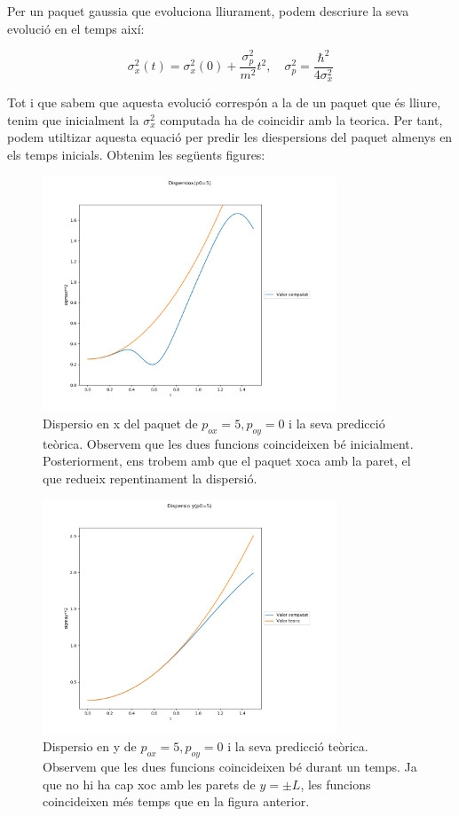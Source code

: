 \documentclass{article}
\begin{document}
Per un paquet gaussia que evoluciona lliurament, podem descriure la seva evolució en el temps així:

\begin{equation}
\sigma_x^2(t)=\sigma_x^2(0)+\frac{\sigma_p^2}{m^2}t^2, \quad \sigma_p^2=\frac{\hbar^2}{4\sigma_x^2}
\end{equation}

Tot i que sabem que aquesta evolució correspón a la de un paquet que és lliure, tenim que inicialment la \(\sigma_x^2\) computada ha de coincidir amb la teorica. Per tant, podem utiltizar aquesta equació per predir les diespersions del paquet almenys en els temps inicials. Obtenim les següents figures:

\begin{figure}[H]
	\includegraphics[width=\textwidth,height=7cm]{dispersioxpo5.png}
	\caption{Dispersio en x del paquet de \(p_{ox}=5,p_{oy}=0\) i la seva predicció teòrica. Observem que les dues funcions coincideixen bé inicialment. Posteriorment, ens trobem amb que el paquet xoca amb la paret, el que redueix repentinament la dispersió.}
\end{figure}
\begin{figure}[H]
	\includegraphics[width=\textwidth,height=7cm]{dispersioypo05.png}
	\caption{ Dispersio en y de \(p_{ox}=5,p_{oy}=0\) i la seva predicció teòrica. Observem que les dues funcions coincideixen bé durant un temps. Ja que no hi ha cap xoc amb les parets de \(y=\pm L\), les funcions coincideixen més temps que en la figura anterior.}
\end{figure}
\end{document}
